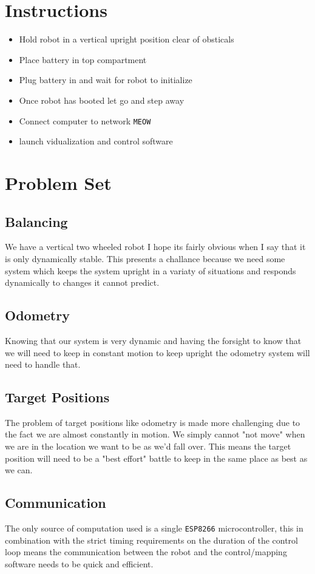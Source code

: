 \documentclass[12pt]{article}
\begin{document}
\section{Instructions}
\begin{itemize}
	\item Hold robot in a vertical upright position clear of obsticals
	\item Place battery in top compartment
	\item Plug battery in and wait for robot to initialize
	\item Once robot has booted let go and step away
	\item Connect computer to network \texttt{MEOW}
	\item launch vidualization and control software
\end{itemize}

\section{Problem Set}

\subsection{Balancing}
We have a vertical two wheeled robot I hope its fairly obvious when I say that it is only dynamically stable. This presents a challance because we need some system which keeps the system upright in a variaty of situations and responds dynamically to changes it cannot predict.
\subsection{Odometry}
Knowing that our system is very dynamic and having the forsight to know that we will need to keep in constant motion to keep upright the odometry system will need to handle that. 
\subsection{Target Positions}
The problem of target positions like odometry is made more challenging due to the fact we are almost constantly in motion. We simply cannot "not move" when we are in the location we want to be as we'd fall over. This means the target position will need to be a "best effort" battle to keep in the same place as best as we can.
\subsection{Communication}
The only source of computation used is a single \texttt{ESP8266} microcontroller, this in combination with the strict timing requirements on the duration of the control loop means the communication between the robot and the control/mapping software needs to be quick and efficient.
\end{document}
